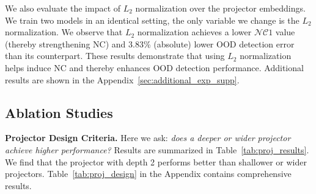 We also evaluate the impact of $L_2$ normalization over the projector embeddings. We train two models in an identical setting, the only variable we change is the $L_2$ normalization. We observe that $L_2$ normalization achieves a lower $\mathcal{NC}1$ value (thereby strengthening NC) and 3.83\% (absolute) lower OOD detection error than its counterpart. These results demonstrate that using $L_2$ normalization helps induce NC and thereby enhances OOD detection performance. Additional results are shown in the Appendix~\ref{sec:additional_exp_supp}.




\subsection{Ablation Studies}


\noindent
\textbf{Projector Design Criteria.}
Here we ask: \emph{does a deeper or wider projector achieve higher performance?}
Results are summarized in Table~\ref{tab:proj_results}. We find that the projector with depth 2 performs better than shallower or wider projectors. %
Table~\ref{tab:proj_design} in the Appendix contains comprehensive results.


